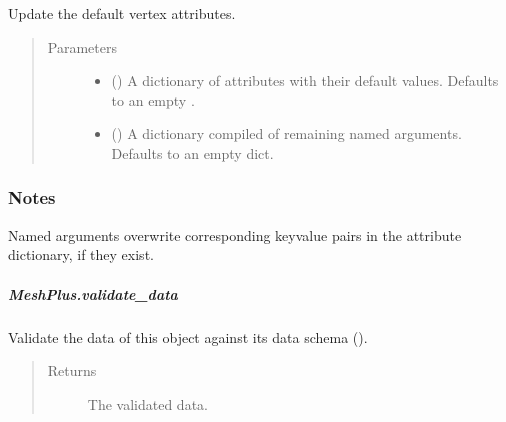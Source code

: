 \documentclass[letterpaper,10pt,english]{sphinxmanual}
\begin{document}
\begin{fulllineitems}
\begin{fulllineitems}
\label{\detokenize{api/generated/directional_clustering.mesh.MeshPlus.update_default_vertex_attributes:directional_clustering.mesh.MeshPlus.update_default_vertex_attributes}}
Update the default vertex attributes.
\begin{quote}\begin{description}
\item[{Parameters}] \leavevmode\begin{itemize}
\item {} 
 () \textendash{} A dictionary of attributes with their default values.
Defaults to an empty .

\item {} 
 () \textendash{} A dictionary compiled of remaining named arguments.
Defaults to an empty dict.

\end{itemize}

\end{description}\end{quote}
\subsubsection*{Notes}

Named arguments overwrite corresponding key\sphinxhyphen{}value pairs in the attribute dictionary,
if they exist.

\end{fulllineitems}



\subparagraph{MeshPlus.validate\_data}
\label{\detokenize{api/generated/directional_clustering.mesh.MeshPlus.validate_data:meshplus-validate-data}}\label{\detokenize{api/generated/directional_clustering.mesh.MeshPlus.validate_data::doc}}

\begin{fulllineitems}
\label{\detokenize{api/generated/directional_clustering.mesh.MeshPlus.validate_data:directional_clustering.mesh.MeshPlus.validate_data}}
Validate the data of this object against its data schema ().
\begin{quote}\begin{description}
\item[{Returns}] \leavevmode
{} \textendash{} The validated data.


\end{description}
\end{quote}
\end{fulllineitems}
\end{fulllineitems}
\end{document}
